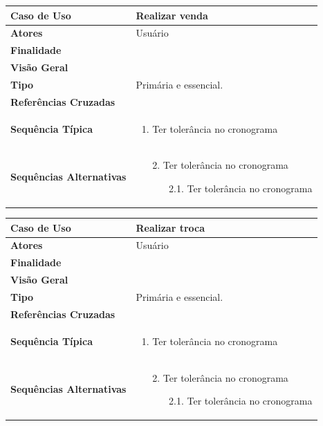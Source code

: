 \documentclass[a4paper,11pt]{article}
\begin{document}
\begin{table}[H]
		\begin{tabularx}{\textwidth}{|l|X|}
		\hline
			\textbf{Caso de Uso} &  Realizar venda \\ \hline
			\textbf{Atores} &  Usuário  \\ \hline
			\textbf{Finalidade} &   \\ \hline
			\textbf{Visão Geral} &  \\ \hline
			\textbf{Tipo} & Primária e essencial. \\ \hline
			\textbf{Referências Cruzadas} &  \\ \hline
			\textbf{Sequência Típica} & 
			\begin{enumerate}
			\item Ter tolerância no cronograma
			\end{enumerate} \\ \hline
			
			\textbf{Sequências Alternativas} & 
			\begin{itemize}
				\item[2.] Ter tolerância no cronograma
				\begin{itemize}
					\item[2.1.] Ter tolerância no cronograma
				\end{itemize}
			\end{itemize} \\ \hline
		\end{tabularx}
\end{table}

\begin{table}[H]
		\begin{tabularx}{\textwidth}{|l|X|}
		\hline
			\textbf{Caso de Uso} &  Realizar troca \\ \hline
			\textbf{Atores} &  Usuário  \\ \hline
			\textbf{Finalidade} &   \\ \hline
			\textbf{Visão Geral} &  \\ \hline
			\textbf{Tipo} & Primária e essencial. \\ \hline
			\textbf{Referências Cruzadas} &  \\ \hline
			\textbf{Sequência Típica} & 
			\begin{enumerate}
			\item Ter tolerância no cronograma
			\end{enumerate} \\ \hline
			
			\textbf{Sequências Alternativas} & 
			\begin{itemize}
				\item[2.] Ter tolerância no cronograma
				\begin{itemize}
					\item[2.1.] Ter tolerância no cronograma
				\end{itemize}
			\end{itemize} \\ \hline
		\end{tabularx}
\end{table}
\end{document}
